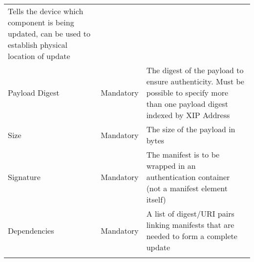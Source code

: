 \begin{longtable}[]{@{}lll@{}}
\begin{minipage}[t]{0.42\columnwidth}
Tells the device which component is being updated, can be used to
establish physical location of update\strut
\end{minipage}\tabularnewline
\begin{minipage}[t]{0.23\columnwidth}\raggedright\strut
Payload Digest\strut
\end{minipage} & \begin{minipage}[t]{0.26\columnwidth}\raggedright\strut
Mandatory\strut
\end{minipage} & \begin{minipage}[t]{0.42\columnwidth}\raggedright\strut
The digest of the payload to ensure authenticity. Must be possible to
specify more than one payload digest indexed by XIP Address\strut
\end{minipage}\tabularnewline
\begin{minipage}[t]{0.23\columnwidth}\raggedright\strut
Size\strut
\end{minipage} & \begin{minipage}[t]{0.26\columnwidth}\raggedright\strut
Mandatory\strut
\end{minipage} & \begin{minipage}[t]{0.42\columnwidth}\raggedright\strut
The size of the payload in bytes\strut
\end{minipage}\tabularnewline
\begin{minipage}[t]{0.23\columnwidth}\raggedright\strut
Signature\strut
\end{minipage} & \begin{minipage}[t]{0.26\columnwidth}\raggedright\strut
Mandatory\strut
\end{minipage} & \begin{minipage}[t]{0.42\columnwidth}\raggedright\strut
The manifest is to be wrapped in an authentication container (not a
manifest element itself)\strut
\end{minipage}\tabularnewline
\begin{minipage}[t]{0.23\columnwidth}\raggedright\strut
Dependencies\strut
\end{minipage} & \begin{minipage}[t]{0.26\columnwidth}\raggedright\strut
Mandatory\strut
\end{minipage} & \begin{minipage}[t]{0.42\columnwidth}\raggedright\strut
A list of digest/URI pairs linking manifests that are needed to form a
complete update\strut
\end{minipage}\tabularnewline
\begin{minipage}[t]{0.23\columnwidth}\raggedright\strut

\end{minipage}
\end{longtable}
